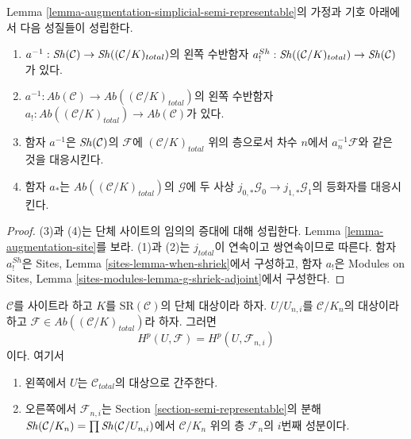 \begin{lemma}
\label{lemma-comparison}
Lemma \ref{lemma-augmentation-simplicial-semi-representable}의
가정과 기호 아래에서 다음 성질들이 성립한다.
\begin{enumerate}
\item $a^{-1} : \mathop{\mathit{Sh}}\nolimits(\mathcal{C}) \to
\mathop{\mathit{Sh}}\nolimits((\mathcal{C}/K)_{total})$의 왼쪽 수반함자
\newline
$a^{Sh}_! : \mathop{\mathit{Sh}}\nolimits((\mathcal{C}/K)_{total}) \to \mathop{\mathit{Sh}}\nolimits(\mathcal{C})$가 있다.
\item $a^{-1} : \textit{Ab}(\mathcal{C}) \to
\textit{Ab}((\mathcal{C}/K)_{total})$의 왼쪽 수반함자
\newline
$a_! : \textit{Ab}((\mathcal{C}/K)_{total}) \to
\textit{Ab}(\mathcal{C})$가 있다.
\item 함자 $a^{-1}$은 $\mathop{\mathit{Sh}}\nolimits(\mathcal{C})$의 $\mathcal{F}$에
$(\mathcal{C}/K)_{total}$ 위의 층으로서 차수 $n$에서
$a_n^{-1}\mathcal{F}$와 같은 것을 대응시킨다.
\item 함자 $a_*$는
$\textit{Ab}((\mathcal{C}/K)_{total})$의 $\mathcal{G}$에 두 사상
$j_{0, *}\mathcal{G}_0 \to j_{1, *}\mathcal{G}_1$의 등화자를 대응시킨다.
\end{enumerate}
\end{lemma}

\begin{proof}
(3)과 (4)는 단체 사이트의 임의의 증대에 대해 성립한다.
Lemma \ref{lemma-augmentation-site}를 보라.
(1)과 (2)는 $j_{total}$이 연속이고 쌍연속이므로 따른다.
함자 $a^{Sh}_!$은 Sites, Lemma \ref{sites-lemma-when-shriek}에서
구성하고, 함자 $a_!$은 Modules on Sites, Lemma
\ref{sites-modules-lemma-g-shriek-adjoint}에서 구성한다.
\end{proof}

\begin{lemma}
\label{lemma-sanity-check-simplicial-semi-representable}
$\mathcal{C}$를 사이트라 하고 $K$를 $\text{SR}(\mathcal{C})$의
단체 대상이라 하자. $U/U_{n, i}$를 $\mathcal{C}/K_n$의 대상이라 하고
$\mathcal{F} \in \textit{Ab}((\mathcal{C}/K)_{total})$라 하자.
그러면
$$
H^p(U, \mathcal{F}) = H^p(U, \mathcal{F}_{n, i})
$$
이다. 여기서
\begin{enumerate}
\item 왼쪽에서 $U$는 $\mathcal{C}_{total}$의 대상으로 간주한다.
\item 오른쪽에서 $\mathcal{F}_{n, i}$는 Section
\ref{section-semi-representable}의 분해
$\mathop{\mathit{Sh}}\nolimits(\mathcal{C}/K_n) = \prod \mathop{\mathit{Sh}}\nolimits(\mathcal{C}/U_{n, i})$에서
$\mathcal{C}/K_n$ 위의 층 $\mathcal{F}_n$의 $i$번째 성분이다.
\end{enumerate}
\end{lemma}

